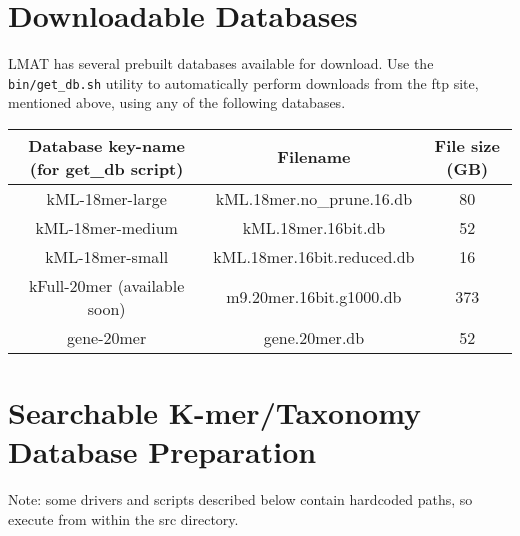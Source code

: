 \documentclass[11pt]{article}
\begin{document}
\section{Downloadable Databases}

LMAT has several prebuilt databases available for download.  Use the \texttt{bin/get\_db.sh} utility to automatically perform downloads from the ftp site, mentioned above, using any of the following databases.  

\begin{tabular}{| c | c | c |}
\hline
Database key-name (for get\_db script) & Filename & File size (GB) \\
\hline
kML-18mer-large & kML.18mer.no_prune.16.db & 80 \\
\hline
kML-18mer-medium & kML.18mer.16bit.db  & 52 \\
\hline
kML-18mer-small & kML.18mer.16bit.reduced.db  & 16 \\
\hline
kFull-20mer (available soon) & m9.20mer.16bit.g1000.db & 373 \\
\hline
gene-20mer & gene.20mer.db & 52 \\
\hline
\end{tabular}






\section{Searchable K-mer/Taxonomy Database Preparation}


Note: some drivers and scripts described below contain hardcoded paths,
      so execute from within the src directory.
\end{document}
